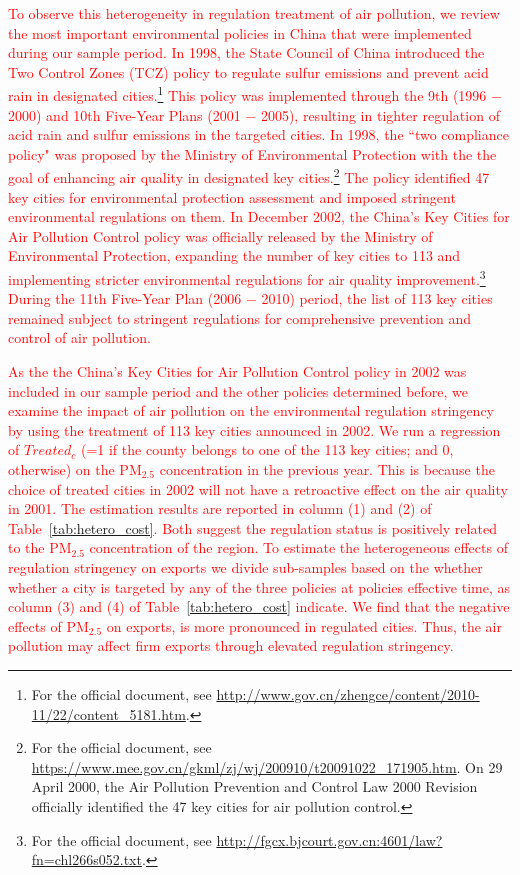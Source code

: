 \documentclass[12pt]{article}
\begin{document}
\textcolor{red}{To observe this heterogeneity in regulation treatment of air pollution, we review the most important environmental policies in China that were implemented during our sample period. In 1998, the State Council of China introduced the Two Control Zones (TCZ) policy to regulate sulfur emissions and prevent acid rain in designated cities.\footnote{For the official document, see \url{http://www.gov.cn/zhengce/content/2010-11/22/content_5181.htm}.} This policy was implemented through the 9th (1996 $-$ 2000) and 10th Five-Year Plans (2001 $-$ 2005), resulting in tighter regulation of acid rain and sulfur emissions in the targeted cities. In 1998, the ``two compliance policy" was proposed by the Ministry of Environmental Protection with the the goal of  enhancing air quality in designated key cities.\footnote{For the official document, see \url{https://www.mee.gov.cn/gkml/zj/wj/200910/t20091022_171905.htm}. On 29 April 2000, the Air Pollution Prevention and Control Law 2000 Revision officially identified the 47 key cities for air pollution control. } The policy identified 47 key cities for environmental protection assessment and imposed stringent environmental regulations on them. In December 2002, the China’s Key Cities for Air Pollution Control policy was officially released by the Ministry of Environmental Protection, expanding the number of key cities to 113 and implementing stricter environmental regulations for air quality improvement.\footnote{For the official document, see \url{http://fgcx.bjcourt.gov.cn:4601/law?fn=chl266s052.txt}.} During the 11th Five-Year Plan (2006 $-$ 2010) period, the list of 113 key cities remained subject to stringent regulations for comprehensive prevention and control of air pollution.}

\textcolor{red}{As the the China’s Key Cities for Air Pollution Control
policy in 2002 was included in our sample period and the other policies determined before, we examine the impact of air pollution on the environmental regulation stringency by using the treatment of 113 key cities announced in 2002. We run a regression of $Treated_{c}$ (=1 if the county belongs to one of the 113 key cities; and 0, otherwise) on the $\mathrm{PM_{2.5}}$ concentration in the previous year. This is because the choice of treated cities in 2002 will not have a retroactive effect on the air quality in 2001. The estimation results are reported in column (1) and (2) of Table~\ref{tab:hetero_cost}. Both suggest the regulation
status is positively related to the $\mathrm{PM_{2.5}}$ concentration of the region. To estimate the heterogeneous effects of regulation stringency on exports we divide sub-samples based on the whether whether a city is targeted by any
of the three policies at policies effective time, as column (3) and (4) of Table~\ref{tab:hetero_cost} indicate. We find that
the negative effects of $\mathrm{PM_{2.5}}$ on exports, is more pronounced
in regulated cities. Thus, the air pollution may affect firm exports through
elevated regulation stringency.}
\end{document}
